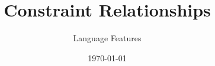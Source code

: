 \documentclass[10pt,xcolor={dvipsnames},fleqn]{beamer}
\title{Constraint Relationships}
\author{Language Features}
\date{\today}
\newcommand{\cemph}[1]{\alert{#1}}
\begin{document}
\titleframe

%
%
%
%
%
%
%
%
%
%
%
%
%
\end{document}
